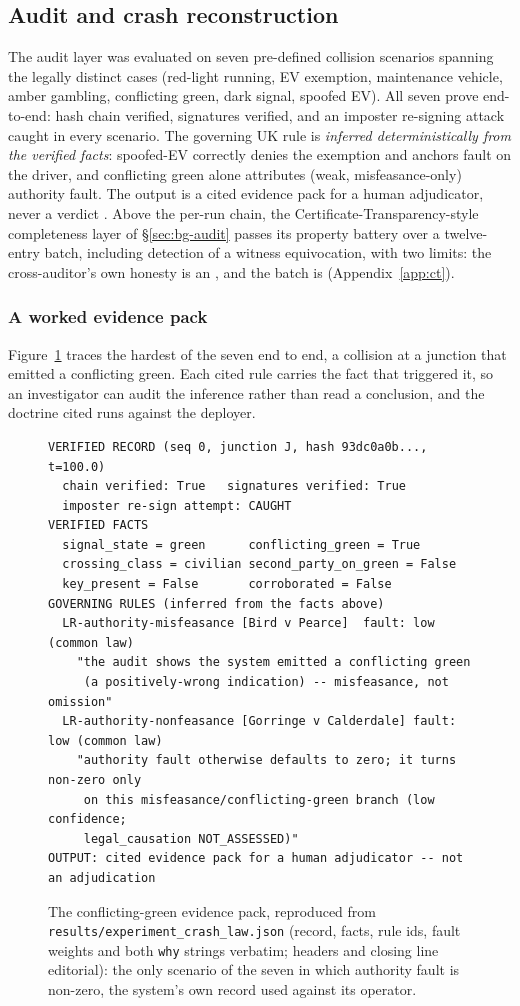 \subsection{Audit and crash reconstruction}\label{sec:res-audit}
The audit layer was evaluated on seven pre-defined collision scenarios
spanning the legally distinct cases (red-light running, EV exemption,
maintenance vehicle, amber gambling, conflicting green, dark signal,
spoofed EV). All seven prove end-to-end: hash chain verified, signatures
verified, and an imposter re-signing attack caught in every scenario. The
governing UK rule is \emph{inferred deterministically from the verified
facts}: spoofed-EV correctly denies the exemption and anchors fault on the
driver, and conflicting green alone attributes (weak, misfeasance-only)
authority fault. The output is a cited evidence pack for a human
adjudicator, never a verdict \cite{dahl2024legal}. Above the per-run
chain, the Certificate-Transparency-style completeness layer of
\S\ref{sec:bg-audit} passes its property battery over a twelve-entry
batch, including detection of a witness equivocation, with two limits: the
cross-auditor's own honesty is an , and the
batch is  (Appendix~\ref{app:ct}).

\subsubsection{A worked evidence pack}\label{sec:res-audit-worked}
Figure~\ref{fig:evpack} traces the hardest of the seven end to end, a
collision at a junction that emitted a conflicting green. Each cited rule
carries the fact that triggered it, so an investigator can audit the
inference rather than read a conclusion, and the doctrine cited runs
against the deployer.

\begin{figure}[t]
\small
\begin{lstlisting}
VERIFIED RECORD (seq 0, junction J, hash 93dc0a0b..., t=100.0)
  chain verified: True   signatures verified: True
  imposter re-sign attempt: CAUGHT
VERIFIED FACTS
  signal_state = green      conflicting_green = True
  crossing_class = civilian second_party_on_green = False
  key_present = False       corroborated = False
GOVERNING RULES (inferred from the facts above)
  LR-authority-misfeasance [Bird v Pearce]  fault: low  (common law)
    "the audit shows the system emitted a conflicting green
     (a positively-wrong indication) -- misfeasance, not omission"
  LR-authority-nonfeasance [Gorringe v Calderdale] fault: low (common law)
    "authority fault otherwise defaults to zero; it turns non-zero only
     on this misfeasance/conflicting-green branch (low confidence;
     legal_causation NOT_ASSESSED)"
OUTPUT: cited evidence pack for a human adjudicator -- not an adjudication
\end{lstlisting}
\caption{The conflicting-green evidence pack, reproduced from
\texttt{results/experiment\_crash\_law.json} (record, facts, rule ids,
fault weights and both \texttt{why} strings verbatim; headers and closing
line editorial): the only scenario of the seven in which authority fault
is non-zero, the system's own record used against its operator.}
\label{fig:evpack}
\end{figure}
